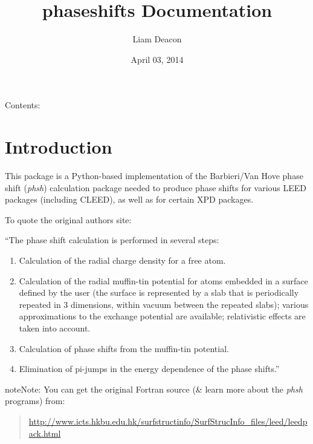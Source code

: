 \documentclass[letterpaper,10pt,english]{sphinxmanual}
\title{phaseshifts Documentation}
\date{April 03, 2014}
\author{Liam Deacon}
\begin{document}
\maketitle
\tableofcontents
{}\label{index::doc}


Contents:


\chapter{Introduction}
\label{introduction:welcome-to-phaseshifts-s-documentation}\label{introduction:introduction}\label{introduction::doc}\label{introduction:id1}
This package is a Python-based implementation of the Barbieri/Van Hove
phase shift (\emph{phsh}) calculation package needed to produce phase shifts for
various LEED packages (including CLEED), as well as for certain XPD packages.

To quote the original authors site:

``The phase shift calculation is performed in several steps:
\begin{enumerate}
\item {} 
Calculation of the radial charge density for a free atom.

\item {} 
Calculation of the radial muffin-tin potential for atoms embedded in a
surface defined by the user (the surface is represented by a slab that
is periodically repeated in 3 dimensions, within vacuum between the
repeated slabs); various approximations to the exchange potential
are available; relativistic effects are taken into account.

\item {} 
Calculation of phase shifts from the muffin-tin potential.

\item {} 
Elimination of pi-jumps in the energy dependence of the phase shifts.''

\end{enumerate}

\begin{notice}{note}{Note:}
You can get the original Fortran source
(\& learn more about the \emph{phsh} programs) from:
\begin{quote}

\href{http://www.icts.hkbu.edu.hk/surfstructinfo/SurfStrucInfo\_files/leed/leedpack.html}{http://www.icts.hkbu.edu.hk/surfstructinfo/SurfStrucInfo\_files/leed/leedpack.html}
\end{quote}
\end{notice}
\end{document}
